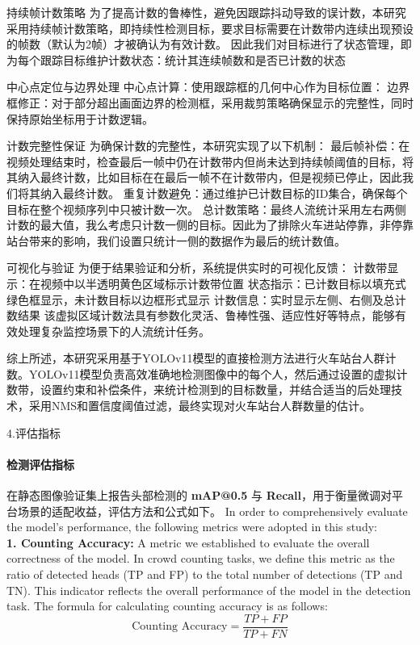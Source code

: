持续帧计数策略
为了提高计数的鲁棒性，避免因跟踪抖动导致的误计数，本研究采用持续帧计数策略，即持续性检测目标，要求目标需要在计数带内连续出现预设的帧数（默认为2帧）才被确认为有效计数。
因此我们对目标进行了状态管理，即为每个跟踪目标维护计数状态：统计其连续帧数和是否已计数的状态

中心点定位与边界处理
中心点计算：使用跟踪框的几何中心作为目标位置：
边界框修正：对于部分超出画面边界的检测框，采用裁剪策略确保显示的完整性，同时保持原始坐标用于计数逻辑。

计数完整性保证
为确保计数的完整性，本研究实现了以下机制：
最后帧补偿：在视频处理结束时，检查最后一帧中仍在计数带内但尚未达到持续帧阈值的目标，将其纳入最终计数，比如目标在在最后一帧不在计数带内，但是视频已停止，因此我们将其纳入最终计数。
重复计数避免：通过维护已计数目标的ID集合，确保每个目标在整个视频序列中只被计数一次。
总计数策略：最终人流统计采用左右两侧计数的最大值，我么考虑只计数一侧的目标。因此为了排除火车进站停靠，非停靠站台带来的影响，我们设置只统计一侧的数据作为最后的统计数值。

可视化与验证
为便于结果验证和分析，系统提供实时的可视化反馈：
计数带显示：在视频中以半透明黄色区域标示计数带位置
状态指示：已计数目标以填充式绿色框显示，未计数目标以边框形式显示
计数信息：实时显示左侧、右侧及总计数结果
该虚拟区域计数法具有参数化灵活、鲁棒性强、适应性好等特点，能够有效处理复杂监控场景下的人流统计任务。

综上所述，本研究采用基于YOLOv11模型的直接检测方法进行火车站台人群计数。YOLOv11模型负责高效准确地检测图像中的每个人，然后通过设置的虚拟计数带，设置约束和补偿条件，来统计检测到的目标数量，并结合适当的后处理技术，采用NMS和置信度阈值过滤，最终实现对火车站台人群数量的估计。


4.评估指标

\paragraph{检测评估指标} 在静态图像验证集上报告头部检测的 \textbf{mAP@0.5} 与 \textbf{Recall}，用于衡量微调对平台场景的适配收益，评估方法和公式如下。
In order to comprehensively evaluate the model's performance, the following metrics were adopted in this study:\\
\textbf{1. Counting Accuracy:} A metric we established to evaluate the overall correctness of the model. In crowd counting tasks, we define this metric as the ratio of detected heads (TP and FP) to the total number of detections (TP and TN). This indicator reflects the overall performance of the model in the detection task. The formula for calculating counting accuracy is as follows:
\begin{equation}
    \text{Counting Accuracy} = \frac{TP + FP}{TP + FN}
\end{equation}

